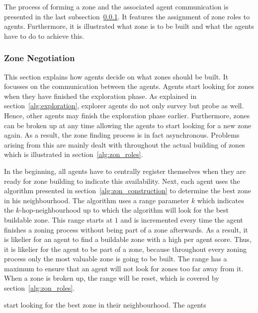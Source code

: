 The process of forming a zone and the associated agent communication is presented in the last subsection~\ref{alg:zon_formation}. It features the assignment of zone roles to agents. Furthermore, it is illustrated what zone is to be built and what the agents have to do to achieve this.



\subsubsection{Zone Negotiation}\label{alg:zon_formation}
This section explains how agents decide on what zones should be built. It focusses on the communication between the agents. Agents start looking for zones when they have finished the exploration phase. As explained in section~\ref{alg:exploration}, explorer agents do not only survey but probe as well. Hence, other agents may finish the exploration phase earlier. Furthermore, zones can be broken up at any time allowing the agents to start looking for a new zone again. As a result, the zone finding process is in fact asynchronous. Problems arising from this are mainly dealt with throughout the actual building of zones which is illustrated in section~\ref{alg:zon_roles}.

In the beginning, all agents have to centrally register themselves when they are ready for zone building to indicate this availability. Next, each agent uses the algorithm presented in section~\ref{alg:zon_construction} to determine the best zone in his neighbourhood. The algorithm uses a range parameter $k$ which indicates the $k$-hop-neighbourhood up to which the algorithm will look for the best buildable zone. This range starts at $1$ and is incremented every time the agent finishes a zoning process without being part of a zone afterwards. As a result, it is likelier for an agent to find a buildable zone with a high per agent score. Thus, it is likelier for the agent to be part of a zone, because throughout every zoning process only the most valuable zone is going to be built. The range has a maximum to ensure that an agent will not look for zones too far away from it. When a zone is broken up, the range will be reset, which is covered by section~\ref{alg:zon_roles}.


start looking for the best zone in their neighbourhood. The agents


